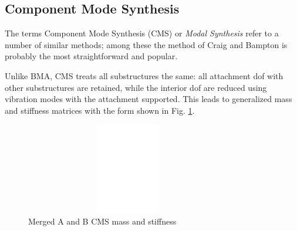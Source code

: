 \documentclass[11pt,openany,twoside]{book}
\numberwithin{equation}{section}		%
\newcommand{\Newterm}[1]{{\em #1}}
\newcommand{\Figref}[1]{Fig. \ref{#1}}  %
\newcommand{\Ss}{substructure}
\begin{document}
\subsection{Component Mode Synthesis}\label{sect:cms}
\par
The terms Component Mode Synthesis (CMS) or \Newterm{Modal Synthesis}
 
refer to a number of similar methods;
among these the method of Craig and Bampton \cite{craig1968coupling}
is probably the most straightforward and popular.
\par
Unlike BMA, CMS treats all substructures the same: all attachment dof
with other substructures are retained, while the interior dof are reduced using
vibration modes with the attachment supported. This leads to generalized mass
and stiffness matrices with the form shown in \Figref{fig:ss-cms}.
\begin{figure}
	\centering
	\includegraphics[height=4.0cm,width=9.0cm]{cms.eps}
	\caption{Merged A and B CMS mass and stiffness}\label{fig:ss-cms}
\end{figure}
\end{document}
